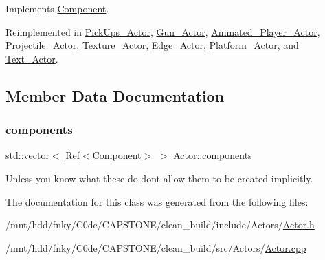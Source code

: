 Implements \hyperlink{classComponent_a3448977e6f464df89e77dda7c6f52204}{Component}.



Reimplemented in \hyperlink{classPickUps__Actor_a3f098ecced007eaa97719faaf7ba35d4}{Pick\+Ups\+\_\+\+Actor}, \hyperlink{classGun__Actor_ab5e7b6b7032e1f0353c6c4f08cedebec}{Gun\+\_\+\+Actor}, \hyperlink{classAnimated__Player__Actor_aa383063c812e8b0015f18485ab000d65}{Animated\+\_\+\+Player\+\_\+\+Actor}, \hyperlink{classProjectile__Actor_ab61aec7117a93626c3096bef71ab30fc}{Projectile\+\_\+\+Actor}, \hyperlink{classTexture__Actor_afe03163ea0bff0ea0fa3c3fb6c560c79}{Texture\+\_\+\+Actor}, \hyperlink{classEdge__Actor_a8ae8a19c72b58522755d2d0a395fc1ea}{Edge\+\_\+\+Actor}, \hyperlink{classPlatform__Actor_a12b22d88efc384ac35060d04fbbe710d}{Platform\+\_\+\+Actor}, and \hyperlink{classText__Actor_a26181e1102ab2a37ec8b140c999a6f6a}{Text\+\_\+\+Actor}.



\subsection{Member Data Documentation}
\mbox{\label{classActor_a1ec17d9a692715e0afbd28309315da03}} 
\subsubsection{\texorpdfstring{components}{components}}
{\footnotesize\ttfamily std\+::vector$<$ \hyperlink{BStateMachine_2Component_8h_add5e90b302c31b74a46619f240214bcc}{Ref}$<$\hyperlink{classComponent}{Component}$>$ $>$ Actor\+::components\hspace{0.3cm}{\ttfamily [private]}}



Unless you know what these do don\textquotesingle{}t allow them to be created implicitly. 



The documentation for this class was generated from the following files\+:\begin{DoxyCompactItemize}
\item 
/mnt/hdd/fnky/\+C0de/\+C\+A\+P\+S\+T\+O\+N\+E/clean\+\_\+build/include/\+Actors/\hyperlink{Actor_8h}{Actor.\+h}\item 
/mnt/hdd/fnky/\+C0de/\+C\+A\+P\+S\+T\+O\+N\+E/clean\+\_\+build/src/\+Actors/\hyperlink{Actor_8cpp}{Actor.\+cpp}\end{DoxyCompactItemize}
